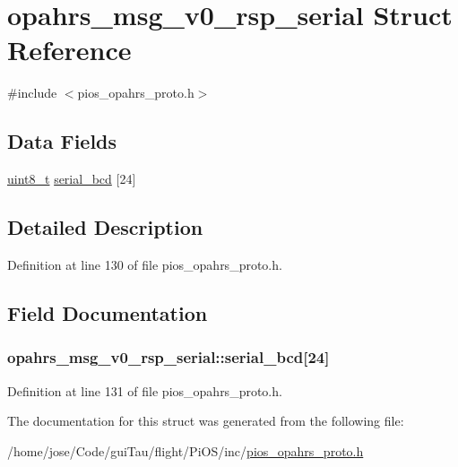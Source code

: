 \hypertarget{structopahrs__msg__v0__rsp__serial}{\section{opahrs\-\_\-msg\-\_\-v0\-\_\-rsp\-\_\-serial Struct Reference}
\label{structopahrs__msg__v0__rsp__serial}
}


{\ttfamily \#include $<$pios\-\_\-opahrs\-\_\-proto.\-h$>$}

\subsection*{Data Fields}
\begin{DoxyCompactItemize}
\item 
\hyperlink{stdint_8h_aba7bc1797add20fe3efdf37ced1182c5}{uint8\-\_\-t} \hyperlink{structopahrs__msg__v0__rsp__serial_aceb9c3f99ae3cb216a58dea9d7f41d07}{serial\-\_\-bcd} \mbox{[}24\mbox{]}
\end{DoxyCompactItemize}


\subsection{Detailed Description}


Definition at line 130 of file pios\-\_\-opahrs\-\_\-proto.\-h.



\subsection{Field Documentation}
\hypertarget{structopahrs__msg__v0__rsp__serial_aceb9c3f99ae3cb216a58dea9d7f41d07}{
\subsubsection[{serial\-\_\-bcd}]{ opahrs\-\_\-msg\-\_\-v0\-\_\-rsp\-\_\-serial\-::serial\-\_\-bcd\mbox{[}24\mbox{]}}}\label{structopahrs__msg__v0__rsp__serial_aceb9c3f99ae3cb216a58dea9d7f41d07}


Definition at line 131 of file pios\-\_\-opahrs\-\_\-proto.\-h.



The documentation for this struct was generated from the following file\-:\begin{DoxyCompactItemize}
\item 
/home/jose/\-Code/gui\-Tau/flight/\-Pi\-O\-S/inc/\hyperlink{pios__opahrs__proto_8h}{pios\-\_\-opahrs\-\_\-proto.\-h}\end{DoxyCompactItemize}
